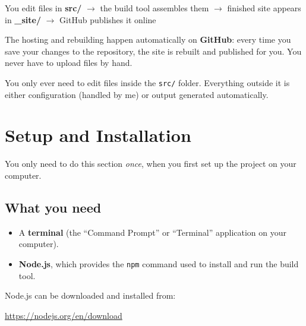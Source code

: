 \documentclass[11pt,a4paper]{article}
\newcommand{\file}[1]{\texttt{#1}}
\newcommand{\cmd}[1]{\texttt{#1}}
\begin{document}
\begin{center}
\begin{minipage}{0.9\textwidth}
\begin{tcolorbox}[colback=soft, colframe=accent!50, arc=2pt, boxrule=0.6pt]
\centering
\ttfamily
You edit files in \textbf{src/} \quad$\longrightarrow$\quad
the build tool assembles them \quad$\longrightarrow$\quad
finished site appears in \textbf{\_site/} \quad$\longrightarrow$\quad
GitHub publishes it online
\end{tcolorbox}
\end{minipage}
\end{center}

\noindent The hosting and rebuilding happen automatically on
\textbf{GitHub}: every time you save your changes to the repository, the
site is rebuilt and published for you. You never have to upload files by
hand.

\begin{tipbox}
You only ever need to edit files inside the \file{src/} folder. Everything
outside it is either configuration (handled by me) or output
generated automatically.
\end{tipbox}

\section{Setup and Installation}

You only need to do this section \emph{once}, when you first set up the
project on your computer.

\subsection{What you need}

\begin{itemize}[leftmargin=1.4em]
  \item A \textbf{terminal} (the ``Command Prompt'' or ``Terminal''
        application on your computer).
  \item \textbf{Node.js}, which provides the \cmd{npm} command used to
        install and run the build tool.
\end{itemize}

\noindent Node.js can be downloaded and installed from:
\begin{center}
\href{https://nodejs.org/en/download}{https://nodejs.org/en/download}
\end{center}
\end{document}
